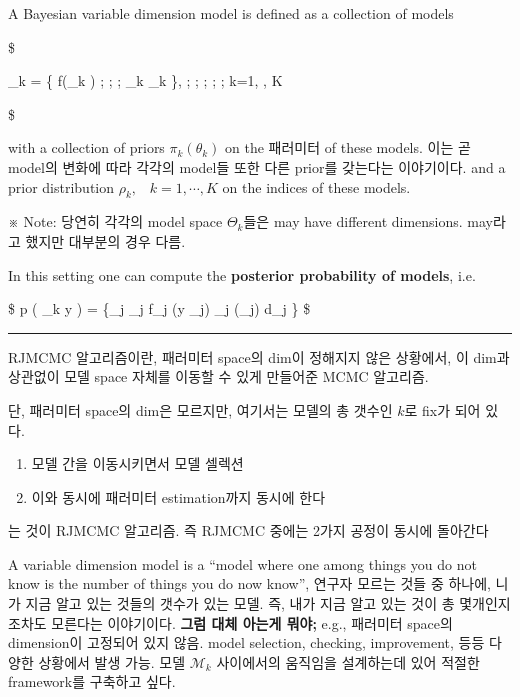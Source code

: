 \documentclass[
]{book}
\providecommand{\tightlist}{%
  \setlength{\itemsep}{0pt}\setlength{\parskip}{0pt}}
\begin{document}
A Bayesian variable dimension model is defined as a collection of models

\$

\_k = \left\{ f(\cdot \lvert \theta\_k ) ; ; ; \theta\_k \in \Theta\_k \right\}, ; ; ; ; ; k=1, \cdots, K

\$

with a collection of priors \(\pi_k (\theta_k)\) on the 패러미터 of these models. 이는 곧 model의 변화에 따라 각각의 model들 또한 다른 prior를 갖는다는 이야기이다. and a prior distribution \(\rho_k, \; \; \; k=1, \cdots, K\) on the indices of these models.

※ Note: 당연히 각각의 model space \(\Theta_k\)들은 may have different dimensions. may라고 했지만 대부분의 경우 다름.

In this setting one can compute the \textbf{posterior probability of models}, i.e.

\$
p \left( \_k \rvert \pmb y \right) =  \{\sum\_j \rho\_j \ast \int f\_j (y \lvert \theta\_j) \ast \pi\_j (\theta\_j) d\theta\_j \}
\$

\begin{center}\rule{0.5\linewidth}{0.5pt}\end{center}

RJMCMC 알고리즘이란, 패러미터 space의 dim이 정해지지 않은 상황에서, 이 dim과 상관없이 모델 space 자체를 이동할 수 있게 만들어준 MCMC 알고리즘.

단, 패러미터 space의 dim은 모르지만, 여기서는 모델의 총 갯수인 \(k\)로 fix가 되어 있다.

\begin{enumerate}
\def\labelenumi{\arabic{enumi}.}
\tightlist
\item
  모델 간을 이동시키면서 모델 셀렉션
\item
  이와 동시에 패러미터 estimation까지 동시에 한다
\end{enumerate}

는 것이 RJMCMC 알고리즘. 즉 RJMCMC 중에는 2가지 공정이 동시에 돌아간다

A variable dimension model is a ``model where one among things you do not know is the number of things you do now know'', 연구자 모르는 것들 중 하나에, 니가 지금 알고 있는 것들의 갯수가 있는 모델. 즉, 내가 지금 알고 있는 것이 총 몇개인지조차도 모른다는 이야기이다. \textbf{그럼 대체 아는게 뭐야;} e.g., 패러미터 space의 dimension이 고정되어 있지 않음. model selection, checking, improvement, 등등 다양한 상황에서 발생 가능. 모델 \(\mathcal{M}_k\) 사이에서의 움직임을 설계하는데 있어 적절한 framework를 구축하고 싶다.
\end{document}
